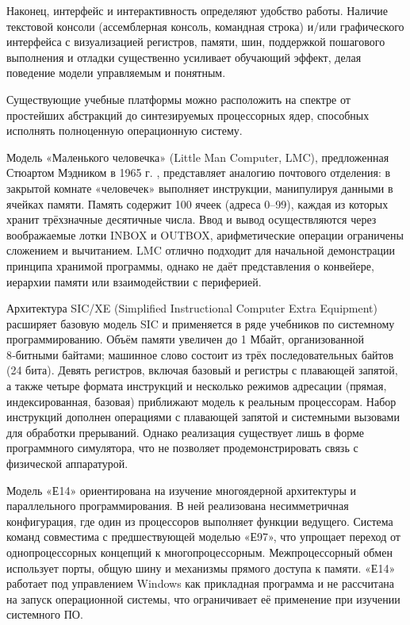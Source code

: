 Наконец, интерфейс и интерактивность определяют удобство работы. Наличие текстовой консоли (ассемблерная консоль, командная строка) и/или графического интерфейса с визуализацией регистров, памяти, шин, поддержкой пошагового выполнения и отладки существенно усиливает обучающий эффект, делая поведение модели управляемым и понятным.

Существующие учебные платформы можно расположить на спектре от простейших абстракций до синтезируемых процессорных ядер, способных исполнять полноценную операционную систему.

Модель «Маленького человечка» (Little Man Computer, LMC), предложенная Стюартом Мэдником в 1965 г. \cite{LMC}, представляет аналогию почтового отделения: в закрытой комнате «человечек» выполняет инструкции, манипулируя данными в ячейках памяти. Память содержит 100 ячеек (адреса 0–99), каждая из которых хранит трёхзначные десятичные числа. Ввод и вывод осуществляются через воображаемые лотки INBOX и OUTBOX, арифметические операции ограничены сложением и вычитанием. LMC отлично подходит для начальной демонстрации принципа хранимой программы, однако не даёт представления о конвейере, иерархии памяти или взаимодействии с периферией.

Архитектура SIC/XE (Simplified Instructional Computer Extra Equipment) \cite{SICXE} расширяет базовую модель SIC и применяется в ряде учебников по системному программированию. Объём памяти увеличен до 1 Мбайт, организованной 8‑битными байтами; машинное слово состоит из трёх последовательных байтов (24 бита). Девять регистров, включая базовый и регистры с плавающей запятой, а также четыре формата инструкций и несколько режимов адресации (прямая, индексированная, базовая) приближают модель к реальным процессорам. Набор инструкций дополнен операциями с плавающей запятой и системными вызовами для обработки прерываний. Однако реализация существует лишь в форме программного симулятора, что не позволяет продемонстрировать связь с физической аппаратурой.

Модель «Е14» \cite{E14} ориентирована на изучение многоядерной архитектуры и параллельного программирования. В ней реализована несимметричная конфигурация, где один из процессоров выполняет функции ведущего. Система команд совместима с предшествующей моделью «Е97», что упрощает переход от однопроцессорных концепций к многопроцессорным. Межпроцессорный обмен использует порты, общую шину и механизмы прямого доступа к памяти. «Е14» работает под управлением Windows как прикладная программа и не рассчитана на запуск операционной системы, что ограничивает её применение при изучении системного ПО.

